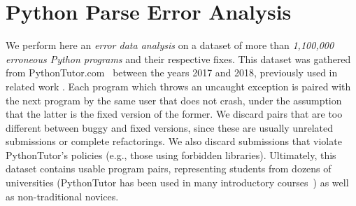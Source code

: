 \section{Python Parse Error Analysis}
\label{sec:error-analysis}

We perform here an \emph{error data analysis} on a \python dataset of more than
\emph{1,100,000 erroneous Python programs} and their respective fixes. This
dataset was gathered from PythonTutor.com~\citep{Guo2013} between the years 2017
and 2018, previously used in related work \citep{Endres2019, Cosman2020}. Each
program which throws an uncaught \python exception is paired with the next
program by the same user that does not crash, under the assumption that the
latter is the fixed version of the former. We discard pairs that are too
different between buggy and fixed versions, since these are usually unrelated
submissions or complete refactorings. We also discard submissions that violate
PythonTutor's policies (e.g., those using forbidden libraries). Ultimately, this
dataset contains usable program pairs, representing students from dozens of
universities (PythonTutor has been used in many introductory
courses~\citep{Guo2013}) as well as non-traditional novices.

